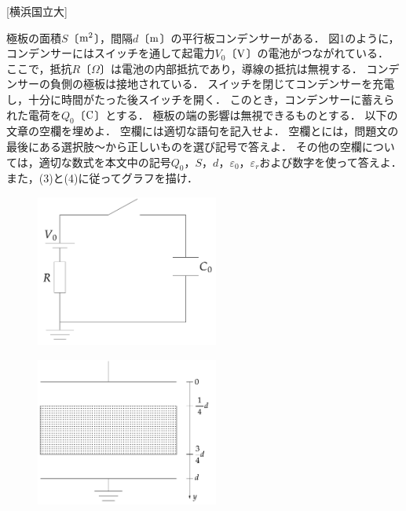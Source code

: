 


\noindent{} [横浜国立大]

極板の面積$S$〔$\mathrm{m}^2$〕，間隔$d$〔$\mathrm{m}$〕の平行板コンデンサーがある．
図1のように，コンデンサーにはスイッチを通して起電力$V_0$〔$\mathrm{V}$〕の電池がつながれている．
ここで，抵抗$R$〔$\Omega$〕は電池の内部抵抗であり，導線の抵抗は無視する．
コンデンサーの負側の極板は接地されている．
スイッチを閉じてコンデンサーを充電し，十分に時間がたった後スイッチを開く．
このとき，コンデンサーに蓄えられた電荷を$Q_0$〔$\mathrm{C}$〕とする．
極板の端の影響は無視できるものとする．
以下の文章の空欄を埋めよ．
空欄には適切な語句を記入せよ．
空欄とには，問題文の最後にある選択肢〜から正しいものを選び記号で答えよ．
その他の空欄については，適切な数式を本文中の記号$Q_0$，$S$，$d$，$\varepsilon_0$，$\varepsilon_r$および数字を使って答えよ．また，(3)と(4)に従ってグラフを描け．

\begin{minipage}{0.45\linewidth}
  \centering
  \begin{figure}[H]
    \centering
    \includegraphics[width=6cm]{fig/fig_4_20_1.pdf}
    \caption{}
  \end{figure}
\end{minipage}
\begin{minipage}{0.45\linewidth}
  \centering
  \begin{figure}[H]
    \centering
    \includegraphics[width=6cm]{fig/fig_4_20_2.pdf}
    \caption{}
  \end{figure}
\end{minipage}

